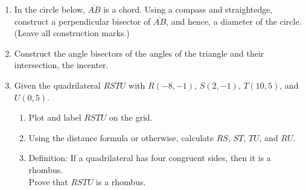 \begin{enumerate}
\item In the circle below, $\overline{AB}$ is a chord. Using a compass and straightedge, construct a perpendicular bisector of $\overline{AB}$, and hence, a diameter of the circle. \\
(Leave all construction marks.)
\vspace{2cm}
\begin{center}
\end{center}

\newpage
\item Construct the angle bisectors of the angles of the triangle and their intersection, the incenter.\\
\vspace{3cm}
\begin{center}
\end{center}

\newpage
\item Given the quadrilateral $RSTU$ with $R(-8,-1)$, $S(2,-1)$, $T(10,5)$, and $U(0,5)$.
\begin{enumerate}
\item Plot and label $RSTU$ on the grid.
\item Using the distance formula or otherwise, calculate $RS$, $ST$, $TU$, and $RU$.
\item Definition: If a quadrilateral has four congruent sides, then it is a rhombus.\\[0.5cm]
Prove that $RSTU$ is a rhombus.
\end{enumerate}

\begin{center} %
\end{center}


\end{enumerate}
